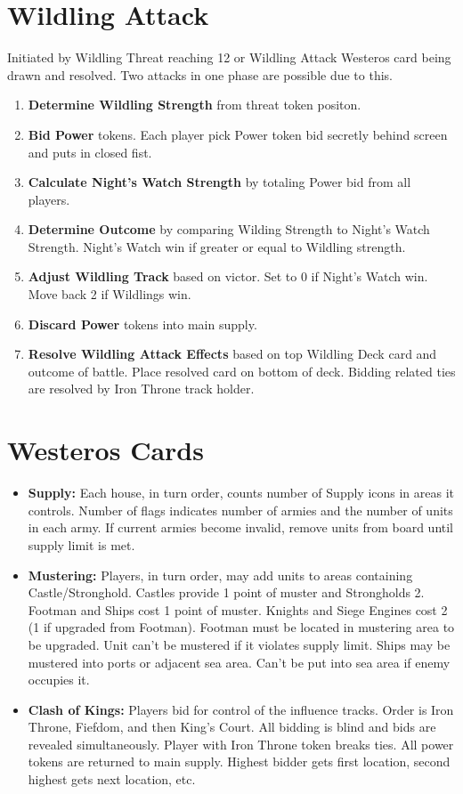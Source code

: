 \documentclass[10pt]{article}
\newenvironment{enumerateCustom}
{\begin{enumerate}
  \setlength{\itemsep}{1pt}
  \setlength{\parskip}{0pt}
  \setlength{\parsep}{0pt}}
{\end{enumerate}}
\newenvironment{itemizeCustom}
{\begin{itemize}
  \setlength{\itemsep}{1pt}
  \setlength{\parskip}{0pt}
  \setlength{\parsep}{0pt}}
{\end{itemize}}
\begin{document}
\begin{multicols*}{2}
\section*{Wildling Attack}
Initiated by Wildling Threat reaching 12 or Wildling Attack Westeros card being drawn and resolved. Two attacks in one phase are possible due to this.
\begin{enumerateCustom}
	\item \textbf{Determine Wildling Strength} from threat token positon.
	\item \textbf{Bid Power} tokens. Each player pick Power token bid secretly behind screen and puts in closed fist.
	\item \textbf{Calculate Night's Watch Strength} by totaling Power bid from all players.
	\item \textbf{Determine Outcome} by comparing Wilding Strength to Night's Watch Strength. Night's Watch win if greater or equal to Wildling strength.
	\item \textbf{Adjust Wildling Track} based on victor. Set to 0 if Night's Watch win. Move back 2 if Wildlings win.
	\item \textbf{Discard Power} tokens into main supply.
	\item \textbf{Resolve Wildling Attack Effects} based on top Wildling Deck card and outcome of battle. Place resolved card on bottom of deck. Bidding related ties are resolved by Iron Throne track holder.
\end{enumerateCustom}

\section*{Westeros Cards}
\begin{itemizeCustom}
	\item \textbf{Supply:} Each house, in turn order, counts number of Supply icons in areas it controls. Number of flags indicates number of armies and the number of units in each army. If current armies become invalid, remove units from board until supply limit is met.
	\item \textbf{Mustering:} Players, in turn order, may add units to areas containing Castle/Stronghold. Castles provide 1 point of muster and Strongholds 2. Footman and Ships cost 1 point of muster. Knights and Siege Engines cost 2 (1 if upgraded from Footman). Footman must be located in mustering area to be upgraded. Unit can't be mustered if it violates supply limit. Ships may be mustered into ports or adjacent sea area. Can't be put into sea area if enemy occupies it.
	\item \textbf{Clash of Kings:} Players bid for control of the influence tracks. Order is Iron Throne, Fiefdom, and then King's Court. All bidding is blind and bids are revealed simultaneously. Player with Iron Throne token breaks ties. All power tokens are returned to main supply. Highest bidder gets first location, second highest gets next location, etc.
\end{itemizeCustom}


\end{multicols*}
\end{document}
